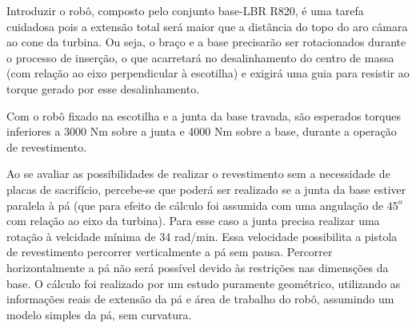 Introduzir o robô, composto pelo conjunto base-LBR R820, é uma tarefa cuidadosa
pois a extensão total será maior que a distância do topo do aro câmara ao
cone da turbina. Ou seja, o braço e a base precisarão ser rotacionados
durante o processo de inserção, o que acarretará no desalinhamento do centro de
massa (com relação ao eixo perpendicular à escotilha) e exigirá uma guia para
resistir ao torque gerado por esse desalinhamento.

Com o robô fixado na escotilha e a junta da base travada, são esperados torques
inferiores a 3000 Nm sobre a junta e 4000 Nm sobre a base, durante a operação de
revestimento.

Ao se avaliar as possibilidades de realizar o revestimento sem a necessidade de
placas de sacrifício, percebe-se que poderá ser realizado se a junta da
base estiver paralela à pá (que para efeito de cálculo foi assumida com uma
angulação de $45^o$ com relação ao eixo da turbina). Para esse caso a junta precisa realizar
uma rotação à velcidade mínima de 34 rad/min. Essa velocidade possibilita a
pistola de revestimento percorrer verticalmente a pá sem pausa. Percorrer
horizontalmente a pá não será possível devido às restrições nas dimensções da
base. O cálculo foi realizado por um estudo puramente geométrico, utilizando as
informações reais de extensão da pá e área de trabalho do robô, assumindo um
modelo simples da pá, sem curvatura.

